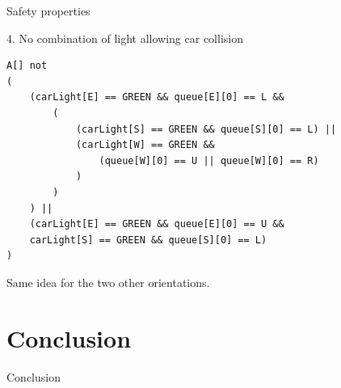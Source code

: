 \documentclass{bredelebeamer}
\begin{document}
\begin{frame}[fragile]{Safety properties}
\begin{block}{4. No combination of light allowing car collision}
\begin{verbatim}
A[] not 
(
    (carLight[E] == GREEN && queue[E][0] == L &&
        (
            (carLight[S] == GREEN && queue[S][0] == L) ||
            (carLight[W] == GREEN &&
                (queue[W][0] == U || queue[W][0] == R)
            )
        )
    ) || 
    (carLight[E] == GREEN && queue[E][0] == U &&
    carLight[S] == GREEN && queue[S][0] == L)
)
\end{verbatim}

Same idea for the two other orientations.
\end{block}
\end{frame}


\section{Conclusion}
\begin{frame}{Conclusion}

\end{frame}
\end{document}
